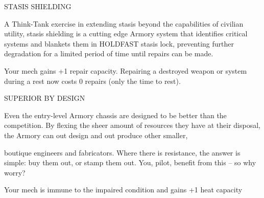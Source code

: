 STASIS SHIELDING

A Think-Tank exercise in extending stasis beyond the capabilities of civilian utility, stasis shielding is a
cutting edge Armory system that identifies critical systems and blankets them in HOLDFAST stasis lock,
preventing further degradation for a limited period of time until repairs can be made.

Your mech gains +1 repair capacity. Repairing a destroyed weapon or system during a rest now
costs 0 repairs (only the time to rest).





SUPERIOR BY DESIGN

Even the entry-level Armory chassis are designed to be better than the competition. By flexing the sheer
amount of resources they have at their disposal, the Armory can out design and out produce other smaller,

boutique engineers and fabricators. Where there is resistance, the answer is simple: buy them out, or
stamp them out. You, pilot, benefit from this -- so why worry?

Your mech is immune to the impaired condition and gains +1 heat capacity
